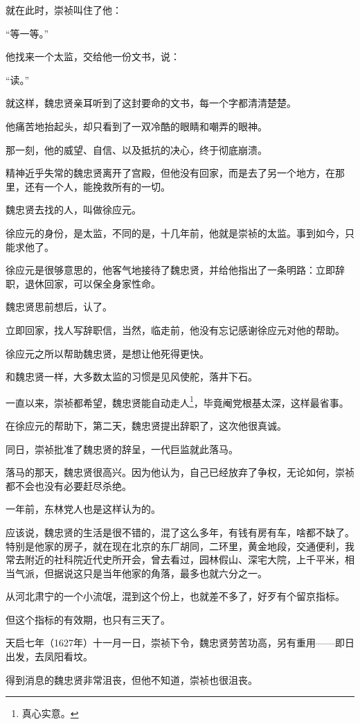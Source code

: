 \begin{multicols}{\theparacolNo}
		就在此时，崇祯叫住了他：

		“等一等。”

		他找来一个太监，交给他一份文书，说：

		“读。”

		就这样，魏忠贤亲耳听到了这封要命的文书，每一个字都清清楚楚。

		他痛苦地抬起头，却只看到了一双冷酷的眼睛和嘲弄的眼神。

		那一刻，他的威望、自信、以及抵抗的决心，终于彻底崩溃。

		精神近乎失常的魏忠贤离开了宫殿，但他没有回家，而是去了另一个地方，在那里，还有一个人，能挽救所有的一切。

		魏忠贤去找的人，叫做徐应元。

		徐应元的身份，是太监，不同的是，十几年前，他就是崇祯的太监。事到如今，只能求他了。

		徐应元是很够意思的，他客气地接待了魏忠贤，并给他指出了一条明路：立即辞职，退休回家，可以保全身家性命。

		魏忠贤思前想后，认了。

		立即回家，找人写辞职信，当然，临走前，他没有忘记感谢徐应元对他的帮助。

		徐应元之所以帮助魏忠贤，是想让他死得更快。

		和魏忠贤一样，大多数太监的习惯是见风使舵，落井下石。

		一直以来，崇祯都希望，魏忠贤能自动走人\footnote{真心实意。}，毕竟阉党根基太深，这样最省事。

		在徐应元的帮助下，第二天，魏忠贤提出辞职了，这次他很真诚。

		同日，崇祯批准了魏忠贤的辞呈，一代巨监就此落马。

		落马的那天，魏忠贤很高兴。因为他认为，自己已经放弃了争权，无论如何，崇祯都不会也没有必要赶尽杀绝。

		一年前，东林党人也是这样认为的。

		应该说，魏忠贤的生活是很不错的，混了这么多年，有钱有房有车，啥都不缺了。特别是他家的房子，就在现在北京的东厂胡同，二环里，黄金地段，交通便利，我常去附近的社科院近代史所开会，曾去看过，园林假山、深宅大院，上千平米，相当气派，但据说这只是当年他家的角落，最多也就六分之一。

		从河北肃宁的一个小流氓，混到这个份上，也就差不多了，好歹有个留京指标。

		但这个指标的有效期，也只有三天了。

		天启七年（1627年）十一月一日，崇祯下令，魏忠贤劳苦功高，另有重用——即日出发，去凤阳看坟。

		得到消息的魏忠贤非常沮丧，但他不知道，崇祯也很沮丧。


\end{multicols}
